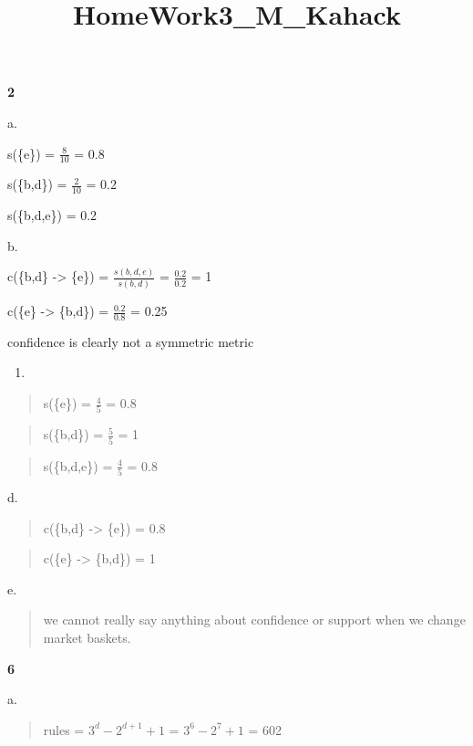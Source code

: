 \documentclass[11pt]{article}
\title{HomeWork3\_M\_Kahack}
\providecommand{\tightlist}{%
      \setlength{\itemsep}{0pt}\setlength{\parskip}{0pt}}
\begin{document}
    
    
    \maketitle
    
    

    
    \textbf{2}

a.

s(\{e\}) = \(\frac{8}{10}\) = 0.8

s(\{b,d\}) = \(\frac{2}{10}\) = 0.2

s(\{b,d,e\}) = 0.2

b.

c(\{b,d\} -\textgreater{} \{e\}) = \(\frac{s({b,d,e})}{s({b,d})}\) =
\(\frac{0.2}{0.2}\) = 1

c(\{e\} -\textgreater{} \{b,d\}) = \(\frac{0.2}{0.8}\) = 0.25

confidence is clearly not a symmetric metric

\begin{enumerate}
\def\labelenumi{\alph{enumi}.}
\setcounter{enumi}{2}
\tightlist
\item
\end{enumerate}

\begin{quote}
s(\{e\}) = \(\frac{4}{5}\) = 0.8
\end{quote}

\begin{quote}
s(\{b,d\}) = \(\frac{5}{5}\) = 1
\end{quote}

\begin{quote}
s(\{b,d,e\}) = \(\frac{4}{5}\) = 0.8
\end{quote}

d.

\begin{quote}
c(\{b,d\} -\textgreater{} \{e\}) = 0.8
\end{quote}

\begin{quote}
c(\{e\} -\textgreater{} \{b,d\}) = 1
\end{quote}

e.

\begin{quote}
we cannot really say anything about confidence or support when we change
market baskets.
\end{quote}

\textbf{6}

a.

\begin{quote}
rules = \(3^d - 2^{d+1} + 1\) = \(3^6 - 2^{7} + 1\) = 602
\end{quote}
\end{document}
